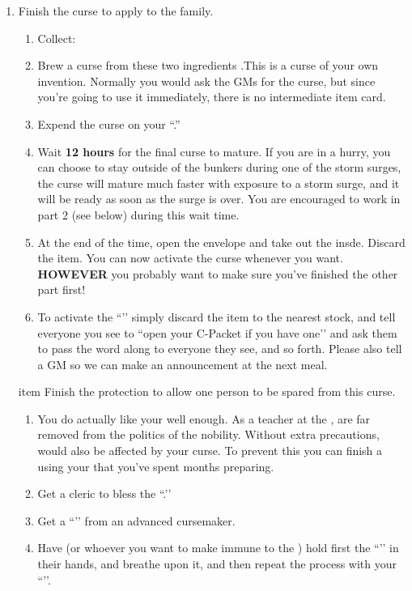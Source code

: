 \documentclass[green]{GL2020}
\begin{document}
\begin{enumerate}
  \item Finish the curse to apply to the \cAdopted{\formal} family.
  \begin{enumerate}
    \item Collect:
    \item Brew a curse from these two ingredients .This is a curse of your own invention. Normally you would ask the GMs for the curse, but since you're going to use it immediately, there is no intermediate item card.
    \item Expend the curse on your ``\iWIPCurse{}.''
    \item Wait \textbf{12 hours} for the final curse to mature. If you are in a hurry, you can choose to stay outside of the bunkers during one of the storm surges, the curse will mature much faster with exposure to a storm surge, and it will be ready as soon as the surge is over. You are encouraged to work in part 2 (see below) during this wait time.
    \item At the end of the time, open the \iWIPCurse{} envelope and take out the \iWithering{} insde. Discard the \iWIPCurse{} item. You can now activate the curse whenever you want. \textbf{HOWEVER} you probably want to make sure you’ve finished the other part first!
    \item To activate the ``\iWithering{}’’ simply discard the item to the nearest stock, and tell everyone you see to ``open your C-Packet if you have one’’ and ask them to pass the word along to everyone they see, and so forth. Please also tell a GM so we can make an announcement at the next meal.
  \end{enumerate}
   item Finish the protection to allow one person to be spared from this curse.
  \begin{enumerate}
    \item You do actually like your \cMusic{\auncle{}} \cMusic{} well enough. As a teacher at the \pSchool{}, \cMusic{\they} are far removed from the politics of the \pFarm{} nobility. Without extra precautions, \cMusic{} would also be affected by your curse. To prevent this you can finish a \iProtection{} using your \iWIPProtection{} that you’ve spent months preparing.
    \item Get a cleric to bless the ``\iWIPProtection{}.’’
    \item Get a ``\iSlowActingPoisonCure{}’’ from an advanced cursemaker.
    \item Have \cMusic{} (or whoever you want to make immune to the \iWithering{}) hold first the ``\iSlowActingPoisonCure{}’’ in their hands, and breathe upon it, and then repeat the process with your ``\iWIPProtection{}’’.

\end{enumerate}
\end{enumerate}
\end{document}
